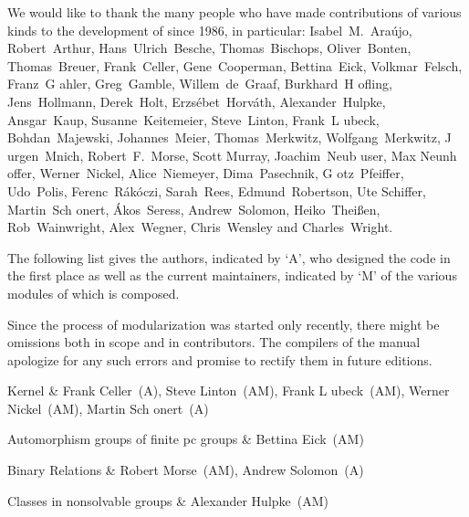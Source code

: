 

{\obeylines%
We would like to thank the many people who have made contributions of
various kinds to the development of {\GAP} since 1986, in particular:
\medskip
Isabel~M.~Ara{\'u}jo, Robert~Arthur, Hans~Ulrich~Besche, Thomas~Bischops,
Oliver~Bonten, Thomas~Breuer, Frank~Celler, Gene~Cooperman, Bettina~Eick,
Volkmar~Felsch, Franz~G{ a}hler, Greg~Gamble, Willem~de~Graaf,
Burkhard~H{ o}fling, Jens~Hollmann, Derek~Holt, Erzs{\'e}bet~Horv{\'a}th, 
Alexander~Hulpke, Ansgar~Kaup, Susanne~Keitemeier, Steve~Linton,
Frank~L{ u}beck, Bohdan~Majewski, Johannes~Meier, Thomas~Merkwitz, 
Wolfgang~Merkwitz, J{ u}rgen~Mnich, Robert~F.~Morse, Scott Murray, 
Joachim~Neub{ u}ser, Max Neunh{ o}ffer, Werner~Nickel, 
Alice~Niemeyer, Dima~Pasechnik, G{ o}tz~Pfeiffer, Udo~Polis,
Ferenc~R{\'a}k{\'o}czi, Sarah~Rees, Edmund~Robertson, Ute Schiffer, 
Martin~Sch{ o}nert, {\'A}kos~Seress, Andrew~Solomon, 
Heiko~Thei{\ss}en, Rob~Wainwright, Alex~Wegner, Chris~Wensley and Charles~Wright.
}%
\bigskip \bigskip \bigskip

The following list gives the authors, indicated by `A', who designed the code in the first
place as well as the current maintainers, indicated by `M' of the various modules of which
{\GAP} is composed.

Since the process of modularization was started only recently, there might
be omissions both in scope and in contributors.  The compilers of the
manual apologize for any such errors and promise to rectify them in future
editions.

\hfuzz=5pt%

\beginitems
Kernel & 
Frank Celler~(A), Steve Linton~(AM), Frank L{ u}beck~(AM), 
Werner Nickel~(AM), Martin Sch{ o}nert~(A)

Automorphism groups of finite pc groups &
Bettina Eick~(AM)

Binary Relations &
Robert Morse~(AM), Andrew Solomon~(A) 

Classes in nonsolvable groups &
Alexander Hulpke~(AM)

